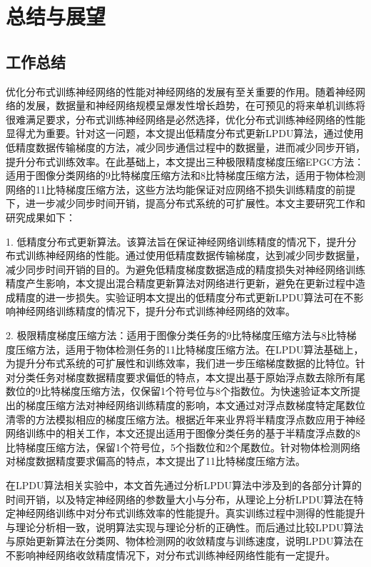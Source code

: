 \chapter{总结与展望}
\section{工作总结}
优化分布式训练神经网络的性能对神经网络的发展有至关重要的作用。随着神经网络的发展，数据量和神经网络规模呈爆发性增长趋势，在可预见的将来单机训练将很难满足要求，分布式训练神经网络是必然选择，优化分布式训练神经网络的性能显得尤为重要。针对这一问题，本文提出低精度分布式更新LPDU算法，通过使用低精度数据传输梯度的方法，减少同步通信过程中的数据量，进而减少同步开销，提升分布式训练效率。在此基础上，本文提出三种极限精度梯度压缩EPGC方法：适用于图像分类网络的9比特梯度压缩方法和8比特梯度压缩方法，适用于物体检测网络的11比特梯度压缩方法，这些方法均能保证对应网络不损失训练精度的前提下，进一步减少同步时间开销，提高分布式系统的可扩展性。本文主要研究工作和研究成果如下：

1. 低精度分布式更新算法。该算法旨在保证神经网络训练精度的情况下，提升分布式训练神经网络的性能。通过使用低精度数据传输梯度，达到减少同步数据量，减少同步时间开销的目的。为避免低精度梯度数据造成的精度损失对神经网络训练精度产生影响，本文提出混合精度更新算法对网络进行更新，避免在更新过程中造成精度的进一步损失。实验证明本文提出的低精度分布式更新LPDU算法可在不影响神经网络训练精度的情况下，提升分布式训练神经网络的效率。

2. 极限精度梯度压缩方法：适用于图像分类任务的9比特梯度压缩方法与8比特梯度压缩方法，适用于物体检测任务的11比特梯度压缩方法。在LPDU算法基础上，为提升分布式系统的可扩展性和训练效率，我们进一步压缩梯度数据的比特位。针对分类任务对梯度数据精度要求偏低的特点，本文提出基于原始浮点数去除所有尾数位的9比特梯度压缩方法，仅保留1个符号位与8个指数位。为快速验证本文所提出的梯度压缩方法对神经网络训练精度的影响，本文通过对浮点数梯度特定尾数位清零的方法模拟相应的梯度压缩方法。根据近年来业界将半精度浮点数应用于神经网络训练中的相关工作，本文还提出适用于图像分类任务的基于半精度浮点数的8比特梯度压缩方法，保留1个符号位，5个指数位和2个尾数位。针对物体检测网络对梯度数据精度要求偏高的特点，本文提出了11比特梯度压缩方法。

在LPDU算法相关实验中，本文首先通过分析LPDU算法中涉及到的各部分计算的时间开销，以及特定神经网络的参数量大小与分布，从理论上分析LPDU算法在特定神经网络训练中对分布式训练效率的性能提升。真实训练过程中测得的性能提升与理论分析相一致，说明算法实现与理论分析的正确性。而后通过比较LPDU算法与原始更新算法在分类网、物体检测网的收敛精度与训练速度，说明LPDU算法在不影响神经网络收敛精度情况下，对分布式训练神经网络性能有一定提升。

